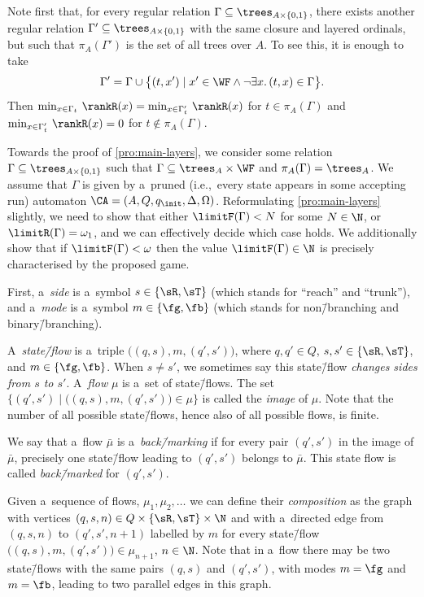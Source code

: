 \documentclass{lmcs}
\numberwithin{equation}{section}
\numberwithin{figure}{section}
\begin{document}
Note first that, for every regular relation $\Gamma\subseteq\trees_{A\times\{0,1\}}$, there exists another regular relation $\Gamma'\subseteq\trees_{A\times\{0,1\}}$ with the same closure and layered ordinals,
but such that $\pi_A(\Gamma')$ is the set of all trees over $A$.
To see this, it is enough to take
\[\Gamma'=\Gamma\cup\big\{(t,x')\mid x'\in\WF\land\neg\exists x.\,(t,x)\in\Gamma\big\}.\]
Then $\min_{x\in \Gamma_t}\,\rankR(x)=\min_{x\in \Gamma'_t}\,\rankR(x)$ for $t\in\pi_A(\Gamma)$ and $\min_{x\in \Gamma'_t}\,\rankR(x)=0$ for $t\not\in\pi_A(\Gamma)$.

Towards the proof of \cref{pro:main-layers}, we consider some relation $\Gamma\subseteq\trees_{A\times\{0,1\}}$ such that $\Gamma\subseteq\trees_A\times\WF$ and $\pi_A(\Gamma)=\trees_A$.
We assume that $\Gamma$ is given by a~pruned (i.e.,~every state appears in some accepting run) automaton $\CA=(A,Q, q_{\init}, \Delta,\Omega)$.
Reformulating \cref{pro:main-layers} slightly, we need to show that either $\limitF(\Gamma)< N$ for some $N\in\N$, or $\limitR(\Gamma)=\omega_1$, and we can effectively decide which case holds.
We additionally show that if $\limitF(\Gamma)<\omega$ then the value $\limitF(\Gamma)\in \N$ is precisely characterised by the proposed game.

First, a~\emph{side} is a~symbol $s\in\{\sR,\sT\}$ (which stands for ``reach'' and ``trunk''),
and a~\emph{mode} is a~symbol $m\in\{\fg,\fb\}$ (which stands for non\=/branching and binary\=/branching).

A~\emph{state\=/flow} is a~triple $\big((q,s), m, (q',s')\big)$, where $q,q'\in Q$, $s,s'\in\{\sR,\sT\}$, and $m\in\{\fg,\fb\}$.
When $s\neq s'$, we sometimes say this state\=/flow \emph{changes sides from $s$ to $s'$}.
A~\emph{flow} $\mu$ is a~set of state\=/flows.
The set $\big\{(q',s')\mid\big((q,s),m,(q',s')\big)\in\mu\big\}$ is called the \emph{image} of $\mu$.
Note that the number of all possible state\=/flows, hence also of all possible flows, is finite.

We say that a~flow $\bar\mu$ is a~\emph{back\=/marking} if for every pair $(q',s')$ in the image of $\bar\mu$, precisely one state\=/flow leading to $(q',s')$ belongs to $\bar{\mu}$.
This state flow is called \emph{back\=/marked} for $(q',s')$.

Given a~sequence of flows, $\mu_1,\mu_2,\dots$ we can define their \emph{composition} as the graph with vertices $(q,s,n)\in Q\times\{\sR,\sT\}\times\N$
and with a~directed edge from $(q,s,n)$ to $(q',s',n{+}1)$ labelled by $m$ for every state\=/flow $\big((q,s),m,(q',s')\big)\in\mu_{n+1}$, $n\in\N$.
Note that in a~flow there may be two state\=/flows with the same pairs $(q,s)$ and $(q',s')$, with modes $m=\fg$ and $m=\fb$, leading to two parallel edges in this graph.
\end{document}
